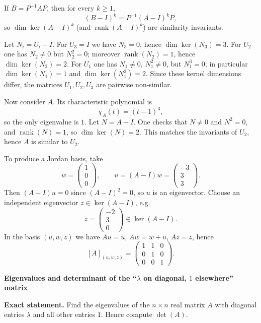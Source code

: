 \begin{solution}
If $B=P^{-1}AP$, then for every $k\ge 1$,
\[
(B-I)^k=P^{-1}(A-I)^kP,
\]
so $\dim\ker(A-I)^k$ (and $\operatorname{rank}(A-I)^k$) are similarity invariants.

Let $N_i=U_i-I$.
For $U_3=I$ we have $N_3=0$, hence $\dim\ker(N_3)=3$.
For $U_2$ one has $N_2\neq 0$ but $N_2^2=0$; moreover $\operatorname{rank}(N_2)=1$, hence $\dim\ker(N_2)=2$.
For $U_1$ one has $N_1\neq 0$, $N_1^2\neq 0$, but $N_1^3=0$; in particular $\dim\ker(N_1)=1$ and $\dim\ker(N_1^2)=2$.
Since these kernel dimensions differ, the matrices $U_1,U_2,U_3$ are pairwise non-similar.

Now consider $A$. Its characteristic polynomial is
\[
\chi_A(t)=(t-1)^3,
\]
so the only eigenvalue is $1$. Let $N=A-I$. One checks that $N\neq 0$ and $N^2=0$, and $\operatorname{rank}(N)=1$,
so $\dim\ker(N)=2$. This matches the invariants of $U_2$, hence $A$ is similar to $U_2$.

To produce a Jordan basis, take
\[
w=\begin{pmatrix}1\\0\\0\end{pmatrix},\qquad
u=(A-I)w=\begin{pmatrix}-3\\3\\3\end{pmatrix}.
\]
Then $(A-I)u=0$ since $(A-I)^2=0$, so $u$ is an eigenvector.
Choose an independent eigenvector $z\in\ker(A-I)$, e.g.
\[
z=\begin{pmatrix}-2\\3\\0\end{pmatrix}\in\ker(A-I).
\]
In the basis $(u,w,z)$ we have $Au=u$, $Aw=w+u$, $Az=z$, hence
\[
[A]_{(u,w,z)}=\begin{pmatrix}1&1&0\\0&1&0\\0&0&1\end{pmatrix}.
\]
\end{solution}

\begin{problem}[CP-I-0067]
\label{prob:cp-i-0067}
\textbf{Eigenvalues and determinant of the ``$\lambda$ on diagonal, $1$ elsewhere'' matrix}

\textbf{Exact statement.}
\hspace*{1.5em}Find the eigenvalues of the $n\times n$ real matrix $A$ with diagonal entries $\lambda$ and all other entries $1$.
Hence compute $\det(A)$.

\end{problem}

